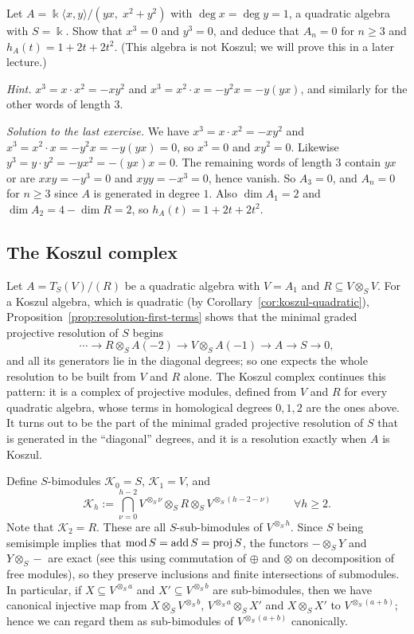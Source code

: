 \begin{exercise}\label{ex:quadratic-non-koszul}
Let $A=\Bbbk\langle x,y\rangle/(yx,\;x^2+y^2)$ with $\deg x=\deg y=1$, a quadratic algebra with $S=\Bbbk$.
Show that $x^3=0$ and $y^3=0$, and deduce that $A_n=0$ for $n\geq3$ and $h_A(t)=1+2t+2t^2$.
(This algebra is not Koszul; we will prove this in a later lecture.)

\emph{Hint.} $x^3=x\cdot x^2=-xy^2$ and $x^3=x^2\cdot x=-y^2x=-y(yx)$, and similarly for the other words of length $3$.
\end{exercise}

\begin{hidden}
\emph{Solution to the last exercise.}
We have $x^3=x\cdot x^2=-xy^2$ and $x^3=x^2\cdot x=-y^2x=-y(yx)=0$, so $x^3=0$ and $xy^2=0$.
Likewise $y^3=y\cdot y^2=-yx^2=-(yx)x=0$.
The remaining words of length $3$ contain $yx$ or are $xxy=-y^3=0$ and $xyy=-x^3=0$, hence vanish.
So $A_3=0$, and $A_n=0$ for $n\geq3$ since $A$ is generated in degree $1$.
Also $\dim A_1=2$ and $\dim A_2=4-\dim R=2$, so $h_A(t)=1+2t+2t^2$.
\end{hidden}


\subsection{The Koszul complex}\label{subsec:koszul-complex}

Let $A=T_S(V)/(R)$ be a quadratic algebra with $V=A_1$ and $R\subseteq V\otimes_SV$.
For a Koszul algebra, which is quadratic (by Corollary~\ref{cor:koszul-quadratic}),  Proposition~\ref{prop:resolution-first-terms} shows that the minimal graded projective resolution of $S$ begins
\[
\cdots\to R\otimes_SA(-2)\to V\otimes_SA(-1)\to A\to S\to0,
\]
and all its generators lie in the diagonal degrees; so one expects the whole resolution to be built from $V$ and $R$ alone.
The Koszul complex continues this pattern: it is a complex of projective modules, defined from $V$ and $R$ for every quadratic algebra, whose terms in homological degrees $0,1,2$ are the ones above.
It turns out to be the part of the minimal graded projective resolution of $S$ that is generated in the ``diagonal'' degrees, and it is a resolution exactly when $A$ is Koszul.

\label{not:koszul-terms}
Define $S$-bimodules $\mathcal K_0=S$, $\mathcal K_1=V$, and \[
\mathcal K_h:=\bigcap_{\nu=0}^{h-2}V^{\otimes_S\nu}\otimes_SR\otimes_SV^{\otimes_S(h-2-\nu)}\qquad \forall h\ge 2.
\]
Note that $\mathcal{K}_2=R$.
These are all $S$-sub-bimodules of $V^{\otimes_Sh}$.
Since $S$ being semisimple implies that $\operatorname{\mathrm{mod}} S=\operatorname{add} S=\operatorname{\mathrm{proj}} S$, the functors $-\otimes_SY$ and $Y\otimes_S-$ are exact (see this using commutation of $\oplus$ and $\otimes$ on decomposition of free modules), so they preserve inclusions and finite intersections of submodules.
In particular, if $X\subseteq V^{\otimes_Sa}$ and $X'\subseteq V^{\otimes_Sb}$ are sub-bimodules, then we have canonical injective map from $X\otimes_SV^{\otimes_Sb}$, $V^{\otimes_Sa}\otimes_SX'$ and $X\otimes_SX'$ to $V^{\otimes_S(a+b)}$; hence we can regard them as sub-bimodules of $V^{\otimes_S(a+b)}$ canonically.

